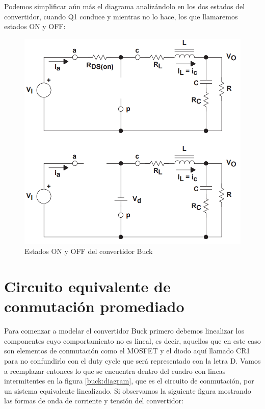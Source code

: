 \documentclass[12pt]{report}
\begin{document}
	Podemos simplificar aún más el diagrama analizándolo en los dos estados del convertidor, cuando Q1 conduce y mientras no lo hace, los que llamaremos estados ON y OFF:
	
	\begin{figure}[H]
		\centering
		\includegraphics[width=\textwidth,height=\textheight,keepaspectratio]{buck_control_on_off}
		\caption{Estados ON y OFF del convertidor Buck}
	\end{figure}

\section{Circuito equivalente de conmutación promediado}

	Para comenzar a modelar el convertidor Buck primero debemos linealizar los componentes cuyo comportamiento no es lineal, es decir, aquellos que en este caso son elementos de conmutación como el MOSFET y el diodo aquí llamado CR1 para no confundirlo con el duty cycle que será representado con la letra D. Vamos a reemplazar entonces lo que se encuentra dentro del cuadro con lineas intermitentes en la figura \ref{buck:diagram}, que es el circuito de conmutación, por un sistema equivalente linealizado. Si observamos la siguiente figura mostrando las formas de onda de corriente y tensión del convertidor:
	
\end{document}
